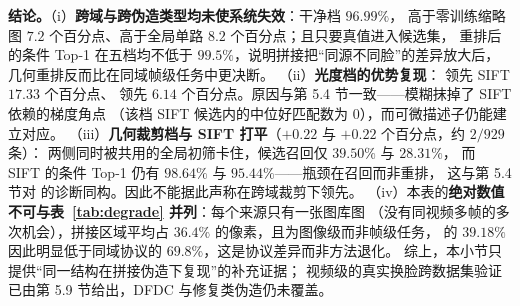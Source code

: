 \textbf{结论。}（i）\textbf{跨域与跨伪造类型均未使系统失效}：干净档 $96.99\%$，
高于零训练缩略图 $7.2$ 个百分点、高于全局单路 $8.2$ 个百分点；且只要真值进入候选集，
重排后的条件 Top-1 在五档均不低于 $99.5\%$，说明拼接把“同源不同脸”的差异放大后，
几何重排反而比在同域帧级任务中更决断。
（ii）\textbf{光度档的优势复现}： 领先 SIFT $17.33$ 个百分点、
 领先 $6.14$ 个百分点。原因与第 5.4 节一致——模糊抹掉了 SIFT 依赖的梯度角点
（该档 SIFT 候选内的中位好匹配数为 $0$），而可微描述子仍能建立对应。
（iii）\textbf{几何裁剪档与 SIFT 打平}（$+0.22$ 与 $+0.22$ 个百分点，约 $2/929$ 条）：
两侧同时被共用的全局初筛卡住，候选召回仅 $39.50\%$ 与 $28.31\%$，
而 SIFT 的条件 Top-1 仍有 $98.64\%$ 与 $95.44\%$——瓶颈在召回而非重排，
这与第 5.4 节对  的诊断同构。因此不能据此声称在跨域裁剪下领先。
（iv）本表的\textbf{绝对数值不可与表~\ref{tab:degrade} 并列}：每个来源只有一张图库图
（没有同视频多帧的多次机会），拼接区域平均占 $36.4\%$ 的像素，且为图像级而非帧级任务，
 的 $39.18\%$ 因此明显低于同域协议的 $69.8\%$，这是协议差异而非方法退化。
综上，本小节只提供“同一结构在拼接伪造下复现”的补充证据；
视频级的真实换脸跨数据集验证已由第 5.9 节给出，DFDC 与修复类伪造仍未覆盖。
